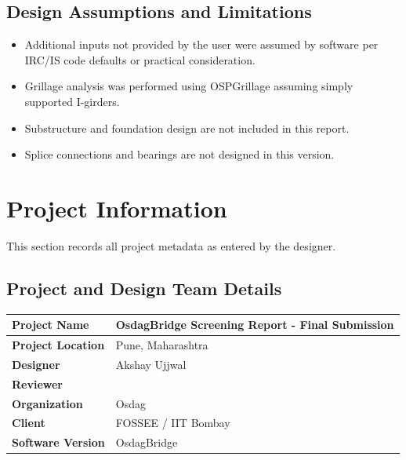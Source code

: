 \documentclass[12pt,a4paper]{report}
\numberwithin{table}{chapter}
\numberwithin{figure}{chapter}
\begin{document}
\section*{Design Assumptions and Limitations}
\label{sec:assumptions}

\begin{itemize}
\item Additional inputs not provided by the user were assumed by software per IRC/IS code defaults or practical consideration.
\item Grillage analysis was performed using OSPGrillage assuming simply supported I-girders.
\item Substructure and foundation design are not included in this report.
\item Splice connections and bearings are not designed in this version.
\end{itemize}

\titleformat{\chapter}[block]{\normalfont\Large\bfseries\centering}{\thechapter}{1em}{}
\titlespacing*{\chapter}{0pt}{-30pt}{10pt}


\chapter{Project Information}

This section records all project metadata as entered by the designer.

\section{Project and Design Team Details}
\label{sec:project-details}

\begin{tabular}{|L{5.5cm}|L{8.5cm}|}
\hline
\textbf{Project Name} & OsdagBridge Screening Report - Final Submission \\
\hline
\textbf{Project Location} & Pune, Maharashtra \\
\hline
\textbf{Designer} & Akshay Ujjwal \\
\hline
\textbf{Reviewer} &  \\
\hline
\textbf{Organization} & Osdag \\
\hline
\textbf{Client} & FOSSEE / IIT Bombay \\
\hline
\textbf{Software Version} & OsdagBridge \\
\hline
\end{tabular}
\end{document}
